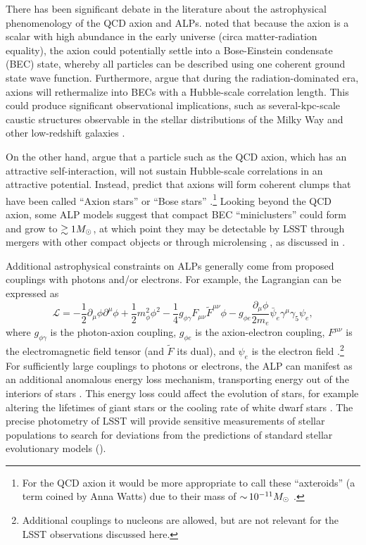 There has been significant debate in the literature about the astrophysical phenomenology of the QCD axion and ALPs.
\citet{Sikivie:2009} noted that because the axion is a scalar with high abundance in the early universe (circa matter-radiation equality), the axion could potentially settle into a Bose-Einstein condensate (BEC) state, whereby all particles can be described using one coherent ground state wave function. 
Furthermore, \citet{Sikivie:2009} argue that during the radiation-dominated era, axions will rethermalize into BECs with a Hubble-scale correlation length.
This could produce significant observational implications, such as several-kpc-scale caustic structures observable in the stellar distributions of the Milky Way and other low-redshift galaxies \citep[\eg,][]{Natarajan:2006,0805.4556,Rindler-Daller:2013zxa}.

On the other hand, \citet{1412.5930} argue that a particle such as the QCD axion, which has an attractive self-interaction, will not sustain Hubble-scale correlations in an attractive potential.
Instead, \citet{1412.5930} predict that axions will form coherent clumps that have been called ``Axion stars'' or ``Bose stars'' \citep[\eg][]{Kolb:1993}.\footnote{For the QCD axion it would be more appropriate to call these ``axteroids'' (a term coined by Anna Watts) due to their mass of $ {\sim}\, 10^{-11} M_\odot$ \citep{Tkachev:1991ka,Braaten:2018nag}.} 
Looking beyond the QCD axion, some ALP models suggest that compact BEC ``miniclusters'' could form and grow to $\gtrsim 1M_\odot$, at which point they may be detectable by LSST through mergers with other compact objects \citep{1808.04746} or through microlensing \citep{1707.03310}, as discussed in .

Additional astrophysical constraints on ALPs generally come from proposed couplings with photons and/or electrons. 
For example, the Lagrangian can be expressed as
\begin{equation}
    \mathcal{L} = -\frac{1}{2} \partial_\mu\phi\partial^\mu\phi + \frac{1}{2}m_\phi^2 \phi^2 - \frac{1}{4}g_{\phi\gamma}F_{\mu\nu}\tilde{F}^{\mu\nu}\phi - g_{\phi e}\frac{\partial_\mu\phi}{2m_e}\bar{\psi}_e \gamma^\mu\gamma_5\psi_e,
\end{equation}
where $g_{\phi\gamma}$ is the photon-axion coupling, $g_{\phi e}$ is the axion-electron coupling, $F^{\mu\nu}$ is the electromagnetic field tensor (and $\tilde{F}$ its dual), and $\psi_e$ is the electron field \citep[\eg][]{1302.6283,Redondo:2013wwa}.\footnote{Additional couplings to nucleons are allowed, but are not relevant for the LSST observations discussed here.}
For sufficiently large couplings to photons or electrons, the ALP can manifest as an additional anomalous energy loss mechanism, transporting energy out of the interiors of stars \citep[\eg,][]{Raffelt:1990}.
This energy loss could affect the evolution of stars, for example altering the lifetimes of giant stars \citep{Ayala:2014,Viaux:2013hca,Viaux:2013lha} or the cooling rate of white dwarf stars \citep{Isern:2008nt}.
The precise photometry of LSST will provide sensitive measurements of stellar populations to search for deviations from the predictions of standard stellar evolutionary models ().

